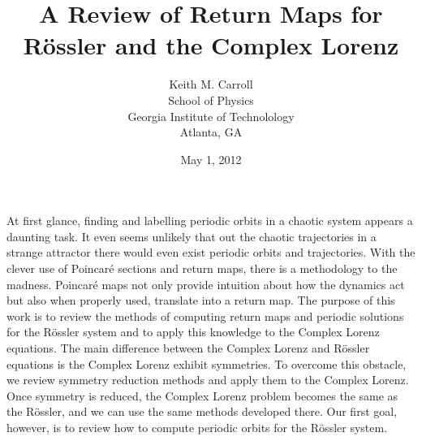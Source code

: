 \documentclass[aip,cha,reprint,
secnumarabic,
nofootinbib, tightenlines,
nobibnotes, showkeys, showpacs,
groupedaddress
]{revtex4-1}
\begin{document}
\title{A Review of Return Maps for R\"ossler and the Complex Lorenz}
\author{Keith M. Carroll\\ School of Physics \\ Georgia Institute of Technolology \\ Atlanta, GA}
\date{May 1, 2012}
\maketitle
At first glance, finding and labelling periodic orbits in a chaotic system appears a daunting task.  It even seems unlikely that out the chaotic trajectories in a strange attractor there would even exist periodic orbits and trajectories.  With the clever use of Poincar\'e sections and return maps, there is a methodology to the madness.  Poincar\'e maps not only provide intuition about how the dynamics act but also when properly used, translate into a return map.  The purpose of this work is to review the methods of computing return maps and periodic solutions for the R\"ossler system and to apply this knowledge to the Complex Lorenz equations.  The main difference between the Complex Lorenz and R\"ossler equations is the Complex Lorenz exhibit symmetries.  To overcome this obstacle, we review symmetry reduction methods and apply them to the Complex Lorenz.  Once symmetry is reduced, the Complex Lorenz problem becomes the same as the R\"ossler, and we can use the same methods developed there.  Our first goal, however, is to review how to compute periodic orbits for the R\"ossler system.
\end{document}
